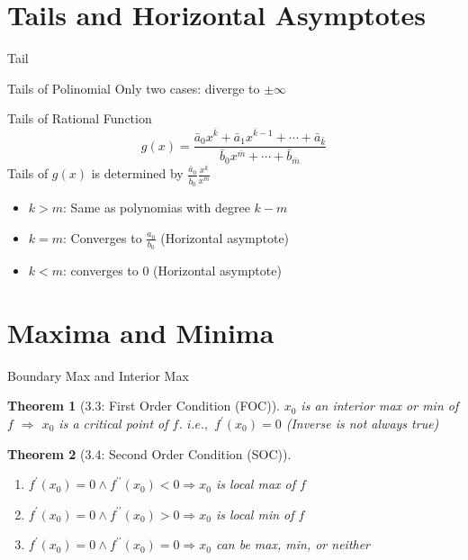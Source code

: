 \documentclass[final]{beamer}
\newtheorem{thm}{Theorem}
\begin{document}
\section{Tails and Horizontal Asymptotes} %
\label{sec:tails_and_horizontal_asymptotes}
\begin{frame}[t]{Tail}
	\begin{block}
		{Tails of Polinomial}
		Only two cases: diverge to $\pm\infty$
	\end{block}
	\begin{block}
		{Tails of Rational Function}
		\[
			g(x) = \frac{\bar a_0 x^{\bar k} + \bar a_1 x^{\bar k-1} + \cdots + \bar a_{\bar k}}{\bar b_0 x^{\bar m} + \cdots +\bar b_{\bar m}}
		\]
		Tails of $g(x)$ is determined by $\frac{\bar a_0}{\bar b_0}\frac{x^{\bar k}}{x^{\bar m}}$
		\begin{itemize}
			\item $k>m$: Same as polynomias with degree $k-m$
			\item $k=m$: Converges to $\frac{a_0}{b_0}$ (Horizontal asymptote)
			\item $k<m$: converges to $0$ (Horizontal asymptote)
		\end{itemize}
	\end{block}
\end{frame}

\section{Maxima and Minima} %
\label{sec:maxima_and_minima}
\begin{frame}[t]{Boundary Max and Interior Max}
	\begin{thm}
		[3.3: First Order Condition (FOC)]
		$x_0$ is an interior max or min of $f$ $\Rightarrow$ $x_0$ is a critical point of $f$. $i.e.,$ $f^\prime(x_0)=0$
		(Inverse is not always true)
	\end{thm}
	
	\begin{thm}
		[3.4: Second Order Condition (SOC)]
		\begin{enumerate}
			\item $f^\prime(x_0)=0 \land f^{\prime\prime}(x_0)<0 \Rightarrow x_0$ is local max of $f$
			\item $f^\prime(x_0)=0 \land f^{\prime\prime}(x_0)>0 \Rightarrow x_0$ is local min of $f$
			\item $f^\prime(x_0)=0 \land f^{\prime\prime}(x_0)=0 \Rightarrow x_0$ can be max, min, or neither
		\end{enumerate}
	\end{thm}
\end{frame}
\end{document}
